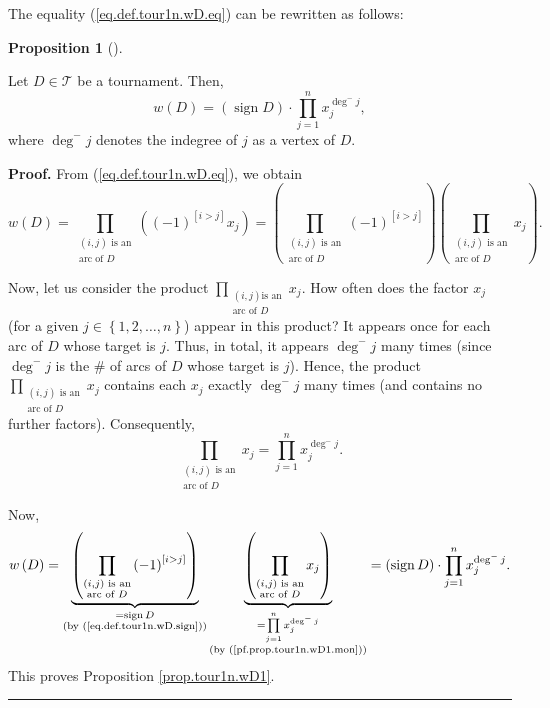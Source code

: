 \documentclass[numbers=enddot,12pt,final,onecolumn,notitlepage]{scrartcl}%
\numberwithin{exer}{subsection}
\theoremstyle{definition}
\newtheorem{prop}[theo]{Proposition}
\newenvironment{proposition}[1][]
{\begin{prop}[#1]\begin{leftbar}}
{\end{leftbar}\end{prop}}
\newenvironment{proof}[1][Proof]{\noindent\textbf{#1.} }{\ \rule{0.5em}{0.5em}}
\let\prodnonlimits\prod
\renewcommand{\prod}{\prodnonlimits\limits}
\begin{document}
The equality (\ref{eq.def.tour1n.wD.eq}) can be rewritten as follows:

\begin{proposition}
\label{prop.tour1n.wD1}Let $D\in\mathcal{T}$ be a tournament. Then,%
\[
w\left(  D\right)  =\left(  \operatorname*{sign}D\right)  \cdot\prod_{j=1}%
^{n}x_{j}^{\deg^{-}j},
\]
where $\deg^{-}j$ denotes the indegree of $j$ as a vertex of $D$.
\end{proposition}

\begin{proof}
From (\ref{eq.def.tour1n.wD.eq}), we obtain%
\[
w\left(  D\right)  =\prod_{\substack{\left(  i,j\right)  \text{ is
an}\\\text{arc of }D}}\left(  \left(  -1\right)  ^{\left[  i>j\right]  }%
x_{j}\right)  =\left(  \prod_{\substack{\left(  i,j\right)  \text{ is
an}\\\text{arc of }D}}\left(  -1\right)  ^{\left[  i>j\right]  }\right)
\left(  \prod_{\substack{\left(  i,j\right)  \text{ is an}\\\text{arc of }%
D}}x_{j}\right)  .
\]


Now, let us consider the product $\prod_{\substack{\left(  i,j\right)  \text{
is an}\\\text{arc of }D}}x_{j}$. How often does the factor $x_{j}$ (for a
given $j\in\left\{  1,2,\ldots,n\right\}  $) appear in this product? It
appears once for each arc of $D$ whose target is $j$. Thus, in total, it
appears $\deg^{-}j$ many times (since $\deg^{-}j$ is the $\#$ of arcs of $D$
whose target is $j$). Hence, the product $\prod_{\substack{\left(  i,j\right)
\text{ is an}\\\text{arc of }D}}x_{j}$ contains each $x_{j}$ exactly $\deg
^{-}j$ many times (and contains no further factors). Consequently,%
\begin{equation}
\prod_{\substack{\left(  i,j\right)  \text{ is an}\\\text{arc of }D}%
}x_{j}=\prod_{j=1}^{n}x_{j}^{\deg^{-}j}. \label{pf.prop.tour1n.wD1.mon}%
\end{equation}


Now,%
\[
w\left(  D\right)  =\underbrace{\left(  \prod_{\substack{\left(  i,j\right)
\text{ is an}\\\text{arc of }D}}\left(  -1\right)  ^{\left[  i>j\right]
}\right)  }_{\substack{=\operatorname*{sign}D\\\text{(by
(\ref{eq.def.tour1n.wD.sign}))}}}\underbrace{\left(  \prod_{\substack{\left(
i,j\right)  \text{ is an}\\\text{arc of }D}}x_{j}\right)  }_{\substack{=\prod
_{j=1}^{n}x_{j}^{\deg^{-}j}\\\text{(by (\ref{pf.prop.tour1n.wD1.mon}))}%
}}=\left(  \operatorname*{sign}D\right)  \cdot\prod_{j=1}^{n}x_{j}^{\deg^{-}%
j}.
\]
This proves Proposition \ref{prop.tour1n.wD1}.
\end{proof}
\end{document}

